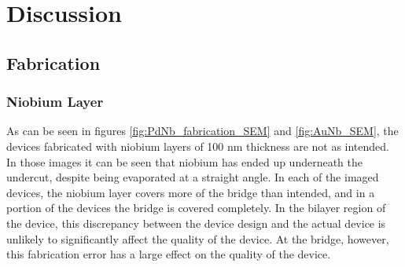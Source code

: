 \section{Discussion}
\label{section:Discussion}

\subsection{Fabrication}
\subsubsection{Niobium Layer}
As can be seen in figures \ref{fig:PdNb_fabrication_SEM} and \ref{fig:AuNb_SEM}, the devices fabricated with niobium layers of 100 nm thickness are not as intended. In those images it can be seen that niobium has ended up underneath the undercut, despite being evaporated at a straight angle. In each of the imaged devices, the niobium layer covers more of the bridge than intended, and in a portion of the devices the bridge is covered completely. In the bilayer region of the device, this discrepancy between the device design and the actual device is unlikely to significantly affect the quality of the device. At the bridge, however, this fabrication error has a large effect on the quality of the device.

